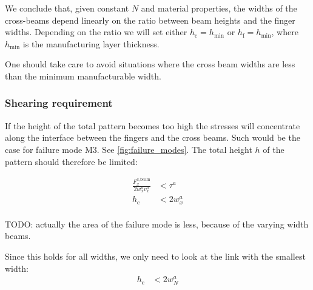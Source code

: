 We conclude that, given constant $N$ and material properties,
the widths of the cross-beams depend linearly on the ratio between beam heights and the finger widths.
Depending on the ratio we will set either $h_\text{c} = h_\text{min}$ or $h_\text{f} = h_\text{min}$,
where $h_\text{min}$ is the manufacturing layer thickness.

One should take care to avoid situations where the cross beam widths are less than the minimum manufacturable width.






\subsubsection{Shearing requirement}
If the height of the total pattern becomes too high the stresses will concentrate along the interface between the fingers and the cross beams.
Such would be the case for failure mode M3.
See \cref{fig:failure_modes}.
The total height $h$ of the pattern should therefore be limited:


\begin{align*}
	\frac{F^{a \text{,beam}}_x }{2w^a_x v^a_x} &< \tau^a \\
	h_\text{c} &< 2 w^a_x  \\
\end{align*}

TODO: actually the area of the failure mode is less, because of the varying width beams.

Since this holds for all widths, we only need to look at the link with the smallest width:
\begin{align*}
	h_\text{c} &< 2 w^a_N \\
\end{align*}

